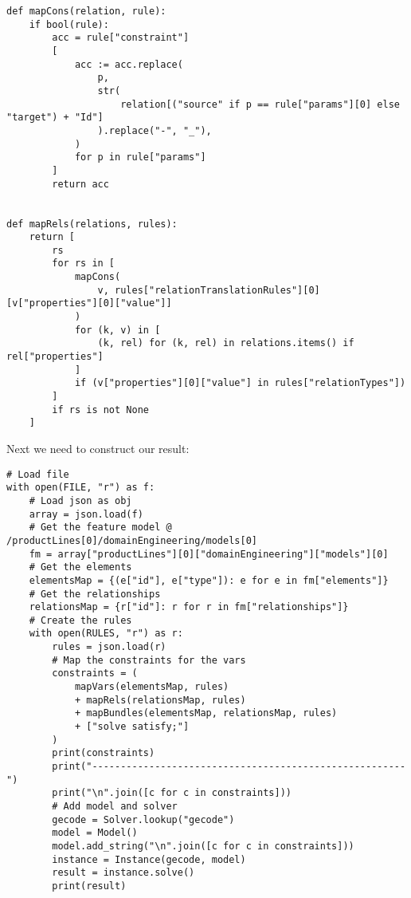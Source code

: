 \documentclass[11pt]{article}
\begin{document}
\begin{verbatim}
def mapCons(relation, rule):
    if bool(rule):
        acc = rule["constraint"]
        [
            acc := acc.replace(
                p,
                str(
                    relation[("source" if p == rule["params"][0] else "target") + "Id"]
                ).replace("-", "_"),
            )
            for p in rule["params"]
        ]
        return acc


def mapRels(relations, rules):
    return [
        rs
        for rs in [
            mapCons(
                v, rules["relationTranslationRules"][0][v["properties"][0]["value"]]
            )
            for (k, v) in [
                (k, rel) for (k, rel) in relations.items() if rel["properties"]
            ]
            if (v["properties"][0]["value"] in rules["relationTypes"])
        ]
        if rs is not None
    ]
\end{verbatim}

Next we need to construct our result:

\begin{verbatim}
# Load file
with open(FILE, "r") as f:
    # Load json as obj
    array = json.load(f)
    # Get the feature model @ /productLines[0]/domainEngineering/models[0]
    fm = array["productLines"][0]["domainEngineering"]["models"][0]
    # Get the elements
    elementsMap = {(e["id"], e["type"]): e for e in fm["elements"]}
    # Get the relationships
    relationsMap = {r["id"]: r for r in fm["relationships"]}
    # Create the rules
    with open(RULES, "r") as r:
        rules = json.load(r)
        # Map the constraints for the vars
        constraints = (
            mapVars(elementsMap, rules)
            + mapRels(relationsMap, rules)
            + mapBundles(elementsMap, relationsMap, rules)
            + ["solve satisfy;"]
        )
        print(constraints)
        print("-------------------------------------------------------")
        print("\n".join([c for c in constraints]))
        # Add model and solver
        gecode = Solver.lookup("gecode")
        model = Model()
        model.add_string("\n".join([c for c in constraints]))
        instance = Instance(gecode, model)
        result = instance.solve()
        print(result)

\end{verbatim}
\end{document}
